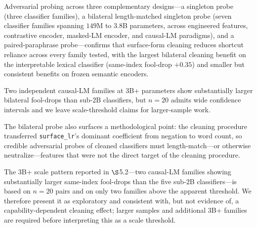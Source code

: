 
Adversarial probing across three complementary designs---a
singleton probe (three classifier families), a bilateral
length-matched singleton probe (seven classifier families spanning
$149$M to $3.8$B parameters, across engineered features,
contrastive encoder, masked-LM encoder, and causal-LM paradigms),
and a paired-paraphrase probe---confirms that surface-form cleaning
reduces shortcut reliance across every family tested, with the
largest bilateral cleaning benefit on the interpretable lexical
classifier (same-index fool-drop $+0.35$) and smaller but
consistent benefits on frozen semantic encoders.

Two independent causal-LM families at $3$B+ parameters show
substantially larger bilateral fool-drops than sub-$2$B classifiers,
but $n=20$ admits wide confidence intervals and we leave
scale-threshold claims for larger-sample work.

The bilateral probe also surfaces a methodological point: the
cleaning procedure transferred \texttt{surface\_lr}'s dominant
coefficient from negation to word count, so credible adversarial
probes of cleaned classifiers must length-match---or otherwise
neutralize---features that were not the direct target of the
cleaning procedure.



The $3$B+ scale pattern reported in $\S$5.2---two causal-LM
families showing substantially larger same-index fool-drops than the
five sub-$2$B classifiers---is based on $n=20$ pairs and on only two
families above the apparent threshold. We therefore present it as
exploratory and consistent with, but not evidence of, a
capability-dependent cleaning effect; larger samples and additional
$3$B+ families are required before interpreting this as a scale
threshold.

